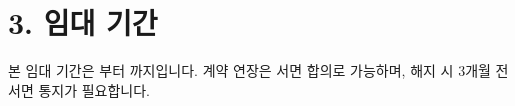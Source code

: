 \section*{3. 임대 기간}
본 임대 기간은 \Rentstartdate 부터 \Rentenddate 까지입니다. 계약 연장은 서면 합의로 가능하며, 해지 시 3개월 전 서면 통지가 필요합니다.
